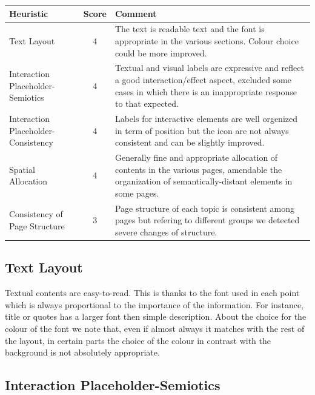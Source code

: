 \begin{table}[H]
  \begin{center}
    \label{tab:table1}
    \begin{tabular}{||l|c|p{8cm}||} %
      \textbf{Heuristic} & \textbf{Score} & \textbf{Comment}\\
      
      \hline
      Text Layout & 4 & The text is readable text and the font is appropriate in the various sections. Colour choice could be more improved.\\
      \hline
      Interaction Placeholder-Semiotics & 4 & Textual and visual labels are expressive and reflect a good interaction/effect aspect, excluded some cases in which there is an inappropriate response to that expected.\\
      \hline
      Interaction Placeholder-Consistency & 4 & Labels for interactive elements are well orgenized in term of position but the icon are not always consistent and can be slightly improved.\\
      \hline
      Spatial Allocation & 4 & Generally fine and appropriate allocation of contents in the various pages, amendable the organization of semantically-distant elements in some pages.\\
      \hline
      Consistency of Page Structure & 3 & Page structure of each topic is consistent among pages but refering to different groups we detected severe changes of structure.\\

    \end{tabular}
  \end{center}
\end{table}

\subsection{Text Layout}
Textual contents are easy-to-read. This is thanks to the font used in each point which is always proportional to the importance of the information. For instance, title or quotes has a larger font then simple description. About the choice for the colour of the font we note that, even if almost always it matches with the rest of the layout, in certain parts the choice of the colour in contrast with the background is not absolutely appropriate.
\subsection{Interaction Placeholder-Semiotics}

